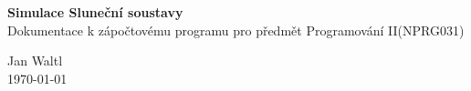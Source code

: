 \begin{titlepage}
	\begin{center}
		\vspace*{8cm}
		\Huge{\textbf{Simulace Sluneční soustavy}}\\
		\vspace*{1cm}
		{\Large Dokumentace k zápočtovému programu pro předmět Programování II(NPRG031)}\\
		\vfill
		
		\huge{Jan Waltl}\\
		\huge{\today}
	\end{center}
\end{titlepage}
	
